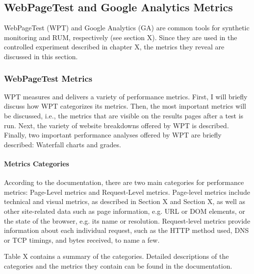 
\subsection{WebPageTest and Google Analytics Metrics} %
\label{subsection:wpt_ga_metrics}

WebPageTest (WPT) and Google Analytics (GA) are common tools for synthetic monitoring and RUM, respectively (see section X).
Since they are used in the controlled experiment described in chapter X, the metrics they reveal are discussed in this section.



\subsubsection{WebPageTest Metrics} %
\label{subsubsection:wpt_metrics}

WPT measures and delivers a variety of performance metrics.
First, I will briefly discuss how WPT categorizes its metrics.
Then, the most important metrics will be discussed, i.e., the metrics that are visible on the results pages after a test is run.
Next, the variety of website breakdowns offered by WPT is described.
Finally, two important performance analyses offered by WPT are briefly described: Waterfall charts and grades.


\paragraph{Metrics Categories} %

According to the documentation, there are two main categories for performance metrics: Page-Level metrics and Request-Level metrics. %
Page-level metrics include technical and visual metrics, as described in Section X and Section X, as well as other site-related data such as page information, e.g. URL or DOM elements, or the state of the browser, e.g. its name or resolution.
Request-level metrics provide information about each individual request, such as the HTTP method used, DNS or TCP timings, and bytes received, to name a few.

Table X contains a summary of the categories.
Detailed descriptions of the categories and the metrics they contain can be found in the documentation.

